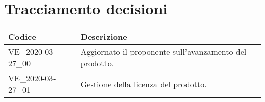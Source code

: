 \section{Tracciamento decisioni}
\renewcommand{\arraystretch}{1.8}

\begin{longtable}{|p{5cm}|p{8cm}|}
	\hline
	
	\rowcolor{header}
	\textbf{Codice} & \textbf{Descrizione} \\
	
	\hline
	
	VE\_2020-03-27\_00 & Aggiornato il proponente sull'avanzamento del prodotto.\\
	VE\_2020-03-27\_01 & Gestione della licenza del prodotto. \\
	
	\hline
\end{longtable}